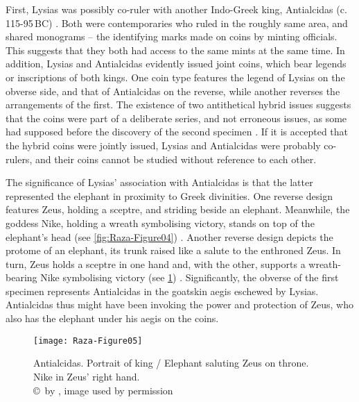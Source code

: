 \documentclass{ijsra}
\renewcommand\BC{{\,BC\xspace}}
\begin{document}
First, Lysias was possibly co-ruler with another Indo-Greek king, Antialcidas (c. 115-95\BC) \parencite[121]{Mairs2014}.
Both were contemporaries who ruled in the roughly same area, and shared monograms – the identifying marks made on coins by minting officials.
This suggests that they both had access to the same mints at the same time.
In addition, Lysias and Antialcidas evidently issued joint coins, which bear legends or inscriptions of both kings.
One coin type features the legend of Lysias on the obverse side, and that of Antialcidas on the reverse, while another reverses the arrangements of the first.
The existence of two antithetical hybrid issues suggests that the coins were part of a deliberate series, and not erroneous issues, as some had supposed before the discovery of the second specimen \parencites[1184]{Bopearachchi2015}[154]{Narain2003}.
If it is accepted that the hybrid coins were jointly issued, Lysias and Antialcidas were probably co-rulers, and their coins cannot be studied without reference to each other.

The significance of Lysias’ association with Antialcidas is that the latter represented the elephant in proximity to Greek divinities.
One reverse design features Zeus, holding a sceptre, and striding beside an elephant. Meanwhile, the goddess Nike, holding a wreath symbolising victory, stands on top of the elephant’s head (see \cref{fig:Raza-Figure04}) \parencite[27]{Narain1991}.
Another reverse design depicts the protome of an elephant, its trunk raised like a salute to the enthroned Zeus.
In turn, Zeus holds a sceptre in one hand and, with the other, supports a wreath-bearing Nike symbolising victory (see \cref{fig:Raza-Figure05}) \parencite[33--34]{Whitehead1970}.
Significantly, the obverse of the first specimen represents Antialcidas in the goatskin aegis eschewed by Lysias.
Antialcidas thus might have been invoking the power and protection of Zeus, who also has the elephant under his aegis on the coins. 

\begin{figure}[!htb] %
	\centering
	\texttt{[image: Raza-Figure05]}
	\caption{Antialcidas. Portrait of king / Elephant saluting Zeus on throne. Nike in Zeus’ right hand.
		{\normalfont\scriptsize \\ \copyright\ by \cite{Coin}, image used by permission}}
	\label{fig:Raza-Figure05}
\end{figure}
\end{document}
